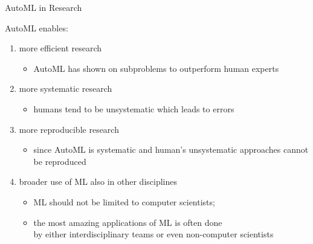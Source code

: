 \begin{frame}[c]{AutoML in Research}

AutoML enables:

\begin{enumerate}
  \item more efficient research
  \begin{itemize}
    \item AutoML has shown on subproblems to outperform human experts
  \end{itemize}
  \pause
  \smallskip
  \item more systematic research
  \begin{itemize}
    \item humans tend to be unsystematic which leads to errors
  \end{itemize}
  \smallskip
  \pause
  \item more reproducible research
  \begin{itemize}
    \item since AutoML is systematic and human's unsystematic approaches cannot be reproduced 
  \end{itemize}
  \item broader use of ML also in other disciplines
  \begin{itemize}
    \item ML should not be limited to computer scientists;
    \item the most amazing applications of ML is often done\\ by either interdisciplinary teams or even non-computer scientists
  \end{itemize}
\end{enumerate}

\end{frame}
